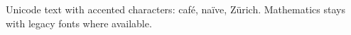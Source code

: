 \documentclass{article}
\begin{document}
Unicode text with accented characters: café, naïve, Zürich.
Mathematics stays with legacy fonts where available.
\end{document}
